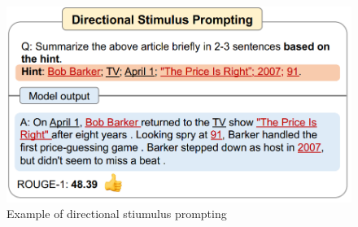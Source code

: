 \documentclass[fleqn,moreauthors,10pt]{ds_report}
\begin{document}
\vspace{10pt}

\begin{figure}[!h]
    \centering
    \includegraphics[width=\linewidth]{fig/directional.png}
    \caption{Example of directional stiumulus prompting}
    \label{fig:column}
\end{figure}
\end{document}
